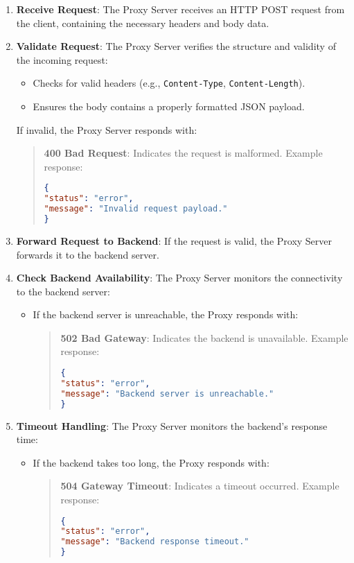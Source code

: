 \documentclass{article}
\begin{document}
\begin{enumerate}
\item \textbf{Receive Request}:
The Proxy Server receives an HTTP POST request from the client, containing the necessary headers and body data.

\item \textbf{Validate Request}:
The Proxy Server verifies the structure and validity of the incoming request:
\begin{itemize}
\item Checks for valid headers (e.g., \texttt{Content-Type}, \texttt{Content-Length}).
\item Ensures the body contains a properly formatted JSON payload.
\end{itemize}
If invalid, the Proxy Server responds with:
\begin{quote}
\textbf{400 Bad Request}: Indicates the request is malformed.
Example response:
\begin{lstlisting}[language=JSON]
{
"status": "error",
"message": "Invalid request payload."
}
\end{lstlisting}
\end{quote}

\item \textbf{Forward Request to Backend}:
If the request is valid, the Proxy Server forwards it to the backend server.

\item \textbf{Check Backend Availability}:
The Proxy Server monitors the connectivity to the backend server:
\begin{itemize}
\item If the backend server is unreachable, the Proxy responds with:
\begin{quote}
\textbf{502 Bad Gateway}: Indicates the backend is unavailable.
Example response:
\begin{lstlisting}[language=JSON]
{
"status": "error",
"message": "Backend server is unreachable."
}
\end{lstlisting}
\end{quote}
\end{itemize}

\item \textbf{Timeout Handling}:
The Proxy Server monitors the backend's response time:
\begin{itemize}
\item If the backend takes too long, the Proxy responds with:
\begin{quote}
\textbf{504 Gateway Timeout}: Indicates a timeout occurred.
Example response:
\begin{lstlisting}[language=JSON]
{
"status": "error",
"message": "Backend response timeout."
}
\end{lstlisting}
\end{quote}
\end{itemize}


\end{enumerate}
\end{document}
